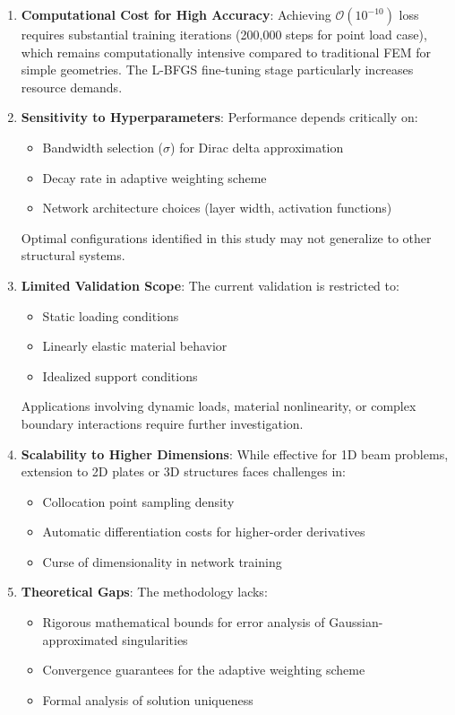 \documentclass[twocolumn]{svjour3}
\begin{document}
	\begin{enumerate}
		\item \textbf{Computational Cost for High Accuracy}: Achieving $\mathcal{ O}(10^{-10})$ loss requires substantial training iterations (200,000 steps for point load case), which remains computationally intensive compared to traditional FEM for simple geometries. The L-BFGS fine-tuning stage particularly increases resource demands.
		
		\item \textbf{Sensitivity to Hyperparameters}: Performance depends critically on:
		
		\begin{itemize}
			\item Bandwidth selection ($\sigma$) for Dirac delta approximation
			\item Decay rate in adaptive weighting scheme
			\item Network architecture choices (layer width, activation functions)
		\end{itemize}
		Optimal configurations identified in this study may not generalize to other structural systems.
		
		\item \textbf{Limited Validation Scope}: The current validation is restricted to:
		\begin{itemize}
			\item Static loading conditions
			\item Linearly elastic material behavior
			\item Idealized support conditions
		\end{itemize}
		Applications involving dynamic loads, material nonlinearity, or complex boundary interactions require further investigation.
		
		\item \textbf{Scalability to Higher Dimensions}: While effective for 1D beam problems, extension to 2D plates or 3D structures faces challenges in:
		\begin{itemize}
			\item Collocation point sampling density
			\item Automatic differentiation costs for higher-order derivatives
			\item Curse of dimensionality in network training
		\end{itemize}
		
		\item \textbf{Theoretical Gaps}: The methodology lacks:
		\begin{itemize}
			\item Rigorous mathematical bounds for error analysis of Gaussian-approximated singularities
			\item Convergence guarantees for the adaptive weighting scheme
			\item Formal analysis of solution uniqueness
		\end{itemize}
		

\end{enumerate}
\end{document}
